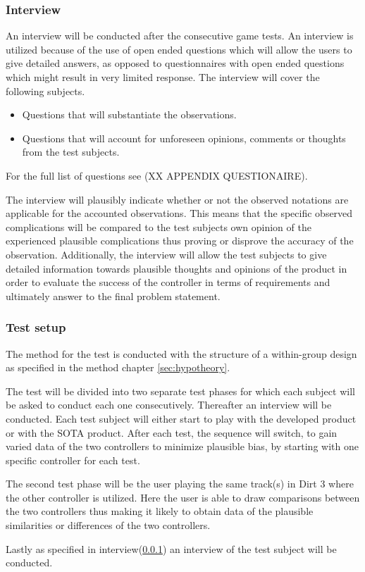 \subsubsection{Interview} \label{sec:interview}
An interview will be conducted after the consecutive game tests. 
An interview is utilized because of the use of open ended questions which will allow the users to give detailed answers, as opposed to questionnaires with open ended questions which might result in very limited response.  
The interview will cover the following subjects.

\begin{itemize}
	\item Questions that will substantiate the observations.
	\item Questions that will account for unforeseen opinions, comments or thoughts from the test subjects.
\end{itemize}

 For the full list of questions see (XX APPENDIX QUESTIONAIRE).
 
 
The interview will plausibly indicate whether or not the observed notations are applicable for the accounted observations.
This means that the specific observed complications will be compared to the test subjects own opinion of the experienced plausible complications thus proving or disprove the accuracy of the observation. 
Additionally, the interview will allow the test subjects to give detailed information towards plausible thoughts and opinions of the product in order to evaluate the success of the controller in terms of requirements and ultimately answer to the final problem statement.


\subsubsection{Test setup}
The method for the test is conducted with the structure of a within-group design as specified in the method chapter \ref{sec:hypotheory}.
\bigskip

The test will be divided into two separate test phases for which each subject will be asked to conduct each one consecutively. 
Thereafter an interview will be conducted. 
Each test subject will either start to play with the developed product or with the SOTA product. 
After each test, the sequence will switch, to gain varied data of the two controllers to minimize plausible bias, by starting with one specific controller for each test.
\bigskip

The second test phase will be the user playing the same track(s) in Dirt 3 where the other controller is utilized. 
Here the user is able to draw comparisons between the two controllers thus making it likely to obtain data of the plausible similarities or differences of the two controllers.
\bigskip

Lastly as specified in interview(\ref{sec:interview}) an interview of the test subject will be conducted. 

